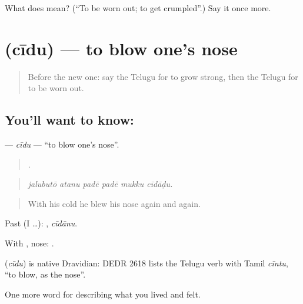 \begin{tcolorbox}[breakable,colback=teal!4,colframe=teal!35!black,title={Before you move on}]
What does  mean? (\textquotedblleft{}To be worn out; to get crumpled\textquotedblright{}.) Say it once more.
\end{tcolorbox}
\section[\texorpdfstring{\te{చీదు} (cīdu)}{చీదు (cīdu)}]{ (cīdu) — to blow one's nose}

\label{lesson:TE-C520-cidu}



\begin{quote}
Before the new one: say the Telugu for to grow strong, then the Telugu for to be worn out.
\end{quote}

\subsection*{You'll want to know: }
\textbf{} — \emph{cīdu} — \textquotedblleft{}to blow one's nose\textquotedblright{}.

\begin{quote}
     .
\end{quote}

\begin{quote}
\emph{jalubutō atanu padē padē mukku cīdāḍu.}
\end{quote}

\begin{quote}
With his cold he blew his nose again and again.
\end{quote}

Past (I …): , \emph{cīdānu}.

With , nose:  .

\begin{cousinweb}
\textbf{} (\emph{cīdu}) is native Dravidian: DEDR 2618 lists the Telugu verb with Tamil \emph{cīntu}, \textquotedblleft{}to blow, as the nose\textquotedblright{}.
\end{cousinweb}

\begin{grammarlens}[title={What you've built}]
One more word for describing what you lived and felt.
\end{grammarlens}

